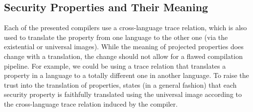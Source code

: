 \documentclass[dvipsnames,conference]{IEEEtran}
\theoremstyle{definition}
\begin{document}


\subsection{Security Properties and Their Meaning}\label{subsec:formalities:props}
Each of the presented compilers use a cross-language trace relation, which is also used to translate the property from one language to the other one (via the existential or universal images).
% 
While the meaning of projected properties does change with a translation, the change should not allow for a flawed compilation pipeline.
% 
For example, we could be using a trace relation that translates a property in a language to a totally different one in another language.
% 
To raise the trust into the translation of properties,  states (in a general fashion) that each security property is faithfully translated using the universal image according to the cross-language trace relation induced by the compiler.
\end{document}

